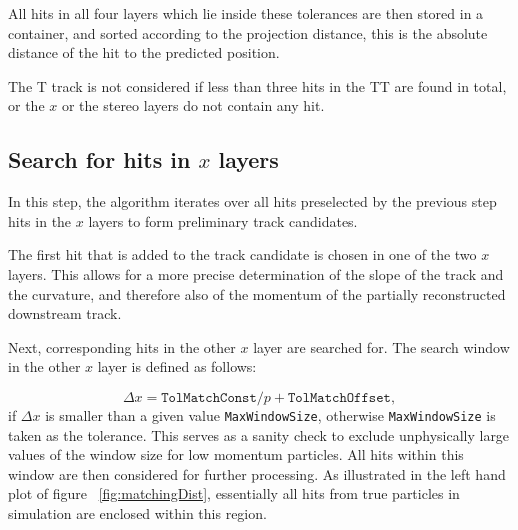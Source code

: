 All hits in all four layers which lie inside these tolerances are then stored in a container, and
sorted according to the projection distance, this is the absolute distance of the hit to the predicted position.

The T track is not considered if less than three hits in the TT are found in
total, or the $x$ or the stereo layers do not contain any hit.


\subsection[Search for hits in $x$ layers]{Search for hits in {\boldmath $x$} layers}
In this step, the algorithm iterates over all hits preselected by the previous step hits in the $x$ layers to form preliminary track candidates.  

The first hit that is added to the track candidate is chosen in one of the two $x$ layers. This allows for a more precise
determination of the slope of the track and the curvature, and therefore also of the momentum of
the partially reconstructed downstream track.

 Next, corresponding hits in the other $x$ layer are
searched for. The search window in the other $x$ layer is defined as follows:

\begin{equation}
\Delta x =  \texttt{TolMatchConst} / p + \texttt{TolMatchOffset} ,
\end{equation}
if $\Delta x$ is smaller than a given value \texttt{MaxWindowSize}, otherwise
\texttt{MaxWindowSize} is taken as the tolerance. This serves as a sanity check
to exclude unphysically large values of the window size for low momentum
particles. All hits within this window are then considered for further
processing. As illustrated in the left hand plot of figure ~\ref{fig:matchingDist}, 
essentially all hits from true particles
in simulation are enclosed within this region.

